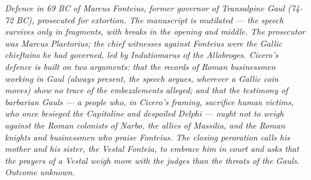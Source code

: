 
\textit{Defence in 69 BC of Marcus Fonteius, former governor
of Transalpine Gaul (74-72 BC), prosecuted for extortion. The
manuscript is mutilated --- the speech survives only in
fragments, with breaks in the opening and middle. The
prosecutor was Marcus Plaetorius; the chief witnesses against
Fonteius were the Gallic chieftains he had governed, led by
Indutiomarus of the Allobroges. Cicero's defence is built on
two arguments: that the records of Roman businessmen working
in Gaul (always present, the speech argues, wherever a Gallic
coin moves) show no trace of the embezzlements alleged; and
that the testimony of barbarian Gauls --- a people who, in
Cicero's framing, sacrifice human victims, who once besieged
the Capitoline and despoiled Delphi --- ought not to weigh
against the Roman colonists of Narbo, the allies of Massilia,
and the Roman knights and businessmen who praise Fonteius.
The closing peroration calls his mother and his sister, the
Vestal Fonteia, to embrace him in court and asks that the
prayers of a Vestal weigh more with the judges than the threats
of the Gauls. Outcome unknown.}
